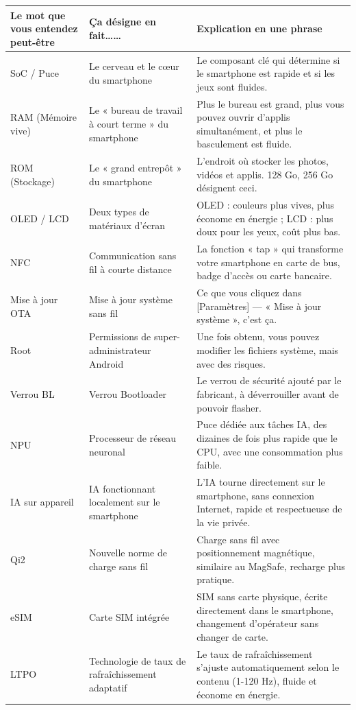 
\begin{center}
\begin{tabularx}{\linewidth}{|X|X|X|}
\hline
\textbf{Le mot que vous entendez peut-être} & \textbf{Ça désigne en fait……} & \textbf{Explication en une phrase} \tabularnewline
\hline
SoC / Puce & Le cerveau et le cœur du smartphone & Le composant clé qui détermine si le smartphone est rapide et si les jeux sont fluides. \tabularnewline
RAM (Mémoire vive) & Le « bureau de travail à court terme » du smartphone & Plus le bureau est grand, plus vous pouvez ouvrir d'applis simultanément, et plus le basculement est fluide. \tabularnewline
ROM (Stockage) & Le « grand entrepôt » du smartphone & L'endroit où stocker les photos, vidéos et applis. 128 Go, 256 Go désignent ceci. \tabularnewline
OLED / LCD & Deux types de matériaux d'écran & OLED : couleurs plus vives, plus économe en énergie ; LCD : plus doux pour les yeux, coût plus bas. \tabularnewline
NFC & Communication sans fil à courte distance & La fonction « tap » qui transforme votre smartphone en carte de bus, badge d'accès ou carte bancaire. \tabularnewline
Mise à jour OTA & Mise à jour système sans fil & Ce que vous cliquez dans [Paramètres] — « Mise à jour système », c'est ça. \tabularnewline
Root & Permissions de super-administrateur Android & Une fois obtenu, vous pouvez modifier les fichiers système, mais avec des risques. \tabularnewline
Verrou BL & Verrou Bootloader & Le verrou de sécurité ajouté par le fabricant, à déverrouiller avant de pouvoir flasher. \tabularnewline
NPU & Processeur de réseau neuronal & Puce dédiée aux tâches IA, des dizaines de fois plus rapide que le CPU, avec une consommation plus faible. \tabularnewline
IA sur appareil & IA fonctionnant localement sur le smartphone & L'IA tourne directement sur le smartphone, sans connexion Internet, rapide et respectueuse de la vie privée. \tabularnewline
Qi2 & Nouvelle norme de charge sans fil & Charge sans fil avec positionnement magnétique, similaire au MagSafe, recharge plus pratique. \tabularnewline
eSIM & Carte SIM intégrée & SIM sans carte physique, écrite directement dans le smartphone, changement d'opérateur sans changer de carte. \tabularnewline
LTPO & Technologie de taux de rafraîchissement adaptatif & Le taux de rafraîchissement s'ajuste automatiquement selon le contenu (1-120 Hz), fluide et économe en énergie. \tabularnewline
\hline
\end{tabularx}
\end{center}
